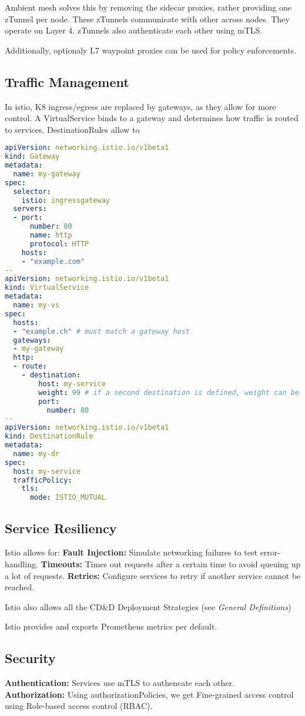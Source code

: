 Ambient mesh solves this by removing the sidecar proxies, rather providing one zTunnel per node. These zTunnels communicate with other across nodes. They operate on Layer 4. zTunnels also authenticate each other using mTLS.

Additionally, optionaly L7 waypoint proxies can be used for policy enforcements.

\subsection{Traffic Management}
In istio, K8 ingress/egress are replaced by gateways, as they allow for more control.
A VirtualService binds to a gateway and determines how traffic is routed to services.
DestinationRules allow to
\begin{lstlisting}[language=yaml]
apiVersion: networking.istio.io/v1beta1
kind: Gateway
metadata:
  name: my-gateway
spec:
  selector:
    istio: ingressgateway
  servers:
  - port:
      number: 80
      name: http
      protocol: HTTP
    hosts:
    - "example.com"
--
apiVersion: networking.istio.io/v1beta1
kind: VirtualService
metadata:
  name: my-vs
spec:
  hosts:
  - "example.ch" # must match a gateway host
  gateways:
  - my-gateway
  http:
  - route:
    - destination:
        host: my-service
        weight: 99 # if a second destination is defined, weight can be used to split traffic accordingly
        port:
          number: 80
--
apiVersion: networking.istio.io/v1beta1
kind: DestinationRule
metadata:
  name: my-dr
spec:
  host: my-service
  trafficPolicy:
    tls:
      mode: ISTIO_MUTUAL
\end{lstlisting}

\subsection{Service Resiliency}
Istio allows for:
\textbf{Fault Injection:} Simulate networking failures to test error-handling.
\textbf{Timeouts:} Times out requests after a certain time to avoid queuing up a lot of requests.
\textbf{Retries:} Configure services to retry if another service cannot be reached.

Istio also allows all the CD\&D Deployment Strategies (see \textit{General Definitions})

Istio provides and exports Prometheus metrics per default.

\subsection{Security}
\textbf{Authentication:} Services use mTLS to authencate each other. \\
\textbf{Authorization:} Using authorizationPolicies, we get Fine-grained access control using Role-based access control (RBAC).


